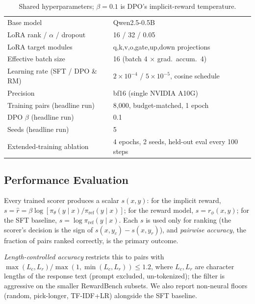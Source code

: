 \documentclass[11pt]{article}
\begin{document}
\begin{table}[H]
\centering
\caption{Shared hyperparameters; $\beta=0.1$ is DPO's implicit-reward temperature.}
\label{tab:hparams}
\begin{tabular}{ll}
\toprule
Base model & Qwen2.5-0.5B \\
LoRA rank / $\alpha$ / dropout & 16 / 32 / 0.05 \\
LoRA target modules & q,k,v,o,gate,up,down projections \\
Effective batch size & 16 (batch 4 $\times$ grad.\ accum.\ 4) \\
Learning rate (SFT / DPO \& RM) & $2\times10^{-4}$ / $5\times10^{-5}$, cosine schedule \\
Precision & bf16 (single NVIDIA A10G) \\
Training pairs (headline run) & 8{,}000, budget-matched, 1 epoch \\
DPO $\beta$ (headline run) & 0.1 \\
Seeds (headline run) & 5 \\
Extended-training ablation & 4 epochs, 2 seeds, held-out eval every 100 steps \\
\bottomrule
\end{tabular}
\end{table}

\subsection{Performance Evaluation}
\label{sec:eval}
Every trained scorer produces a scalar $s(x,y)$: for the implicit reward, $s = \hat r =
\beta\log[\pi_\theta(y\mid x)/\pi_{\mathrm{ref}}(y\mid x)]$; for the reward model, $s =
r_\phi(x,y)$; for the SFT baseline, $s = \log\pi_{\mathrm{ref}}(y\mid x)$. Each $s$ is used only
for ranking (the scorer's decision is the sign of $s(x,y_c)-s(x,y_r)$), and \emph{pairwise
accuracy}, the fraction of pairs ranked correctly, is the primary outcome.

\emph{Length-controlled accuracy} restricts this to pairs with $\max(L_c,L_r)/\max(1,
\min(L_c,L_r)) \le 1.2$, where $L_c,L_r$ are character lengths of the response text (prompt
excluded, un-tokenized); the filter is aggressive on the smaller RewardBench subsets. We also
report non-neural floors (random, pick-longer, TF-IDF+LR) alongside the SFT baseline.
\end{document}
